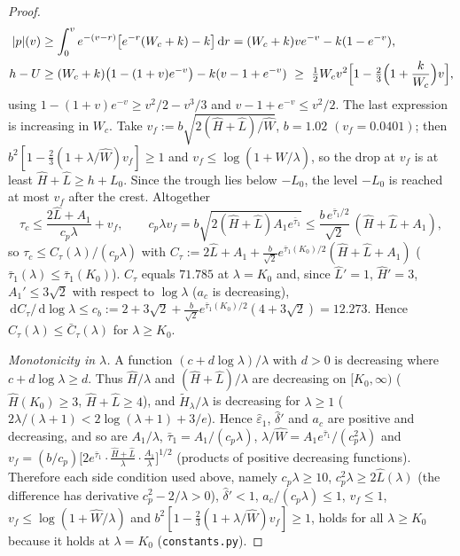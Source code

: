 \documentclass[11pt,a4paper]{article}
\theoremstyle{remark}\newtheorem{remark}[theorem]{Remark}
\newcommand{\dd}{\,\mathrm d}
\begin{document}
\begin{proof}
\begin{align*}
|p|(v)&\ge\int_0^ve^{-(v-r)}\bigl[e^{-r}(W_c+k)-k\bigr]\dd r=(W_c+k)ve^{-v}-k(1-e^{-v}),\\
h-U&\ge(W_c+k)\bigl(1-(1+v)e^{-v}\bigr)-k(v-1+e^{-v})\ \ge\ \tfrac12W_cv^2\Bigl[1-\tfrac23\Bigl(1+\frac k{W_c}\Bigr)v\Bigr],
\end{align*}
using $1-(1+v)e^{-v}\ge v^2/2-v^3/3$ and $v-1+e^{-v}\le v^2/2$. The last expression is increasing in
$W_c$. Take $v_f:=b\sqrt{2(\hat H+\hat L)/\hat W}$, $b=1.02$ $(v_f=0.0401)$; then
$b^2[1-\tfrac23(1+\lambda/\hat W)v_f]\ge1$ and $v_f\le\log(1+\hat W/\lambda)$, so the drop at $v_f$ is at
least $\hat H+\hat L\ge h+L_0$. Since the trough lies below $-L_0$, the level $-L_0$ is reached at most
$v_f$ after the crest. Altogether
\[
\tau_c\le\frac{2\hat L+A_1}{c_p\lambda}+v_f,\qquad
c_p\lambda v_f=b\sqrt{2(\hat H+\hat L)A_1e^{\bar\tau_1}}\le\frac{b\,e^{\bar\tau_1/2}}{\sqrt2}\,(\hat H+\hat L+A_1),
\]
so $\tau_c\le C_\tau(\lambda)/(c_p\lambda)$ with
$C_\tau:=2\hat L+A_1+\tfrac{b}{\sqrt2}e^{\bar\tau_1(K_0)/2}(\hat H+\hat L+A_1)$
($\bar\tau_1(\lambda)\le\bar\tau_1(K_0)$). $C_\tau$ equals $71.785$ at $\lambda=K_0$ and, since
$\hat L'=1$, $\hat H'=3$, $A_1'\le3\sqrt2$ with respect to $\log\lambda$ ($a_c$ is decreasing),
$\dd C_\tau/\dd\log\lambda\le c_b:=2+3\sqrt2+\tfrac{b}{\sqrt2}e^{\bar\tau_1(K_0)/2}(4+3\sqrt2)=12.273$.
Hence $C_\tau(\lambda)\le\bar C_\tau(\lambda)$ for $\lambda\ge K_0$.

\emph{Monotonicity in $\lambda$.} A function $(c+d\log\lambda)/\lambda$ with $d>0$ is decreasing where
$c+d\log\lambda\ge d$. Thus $\hat H/\lambda$ and $(\hat H+\hat L)/\lambda$ are decreasing on $[K_0,\infty)$
($\hat H(K_0)\ge3$, $\hat H+\hat L\ge4$), and $\tilde H_\lambda/\lambda$ is decreasing for $\lambda\ge1$
($2\lambda/(\lambda+1)<2\log(\lambda+1)+3/e$). Hence $\hat\varepsilon_1$, $\hat\delta'$ and $a_c$ are
positive and decreasing, and so are $A_1/\lambda$, $\bar\tau_1=A_1/(c_p\lambda)$,
$\lambda/\hat W=A_1e^{\bar\tau_1}/(c_p^2\lambda)$ and
$v_f=(b/c_p)\bigl[2e^{\bar\tau_1}\cdot\tfrac{\hat H+\hat L}{\lambda}\cdot\tfrac{A_1}{\lambda}\bigr]^{1/2}$
(products of positive decreasing functions). Therefore each side condition used above, namely
$c_p\lambda\ge10$, $c_p^2\lambda\ge2\hat L(\lambda)$ (the difference has derivative $c_p^2-2/\lambda>0$),
$\hat\delta'<1$, $a_c/(c_p\lambda)\le1$, $v_f\le1$, $v_f\le\log(1+\hat W/\lambda)$ and
$b^2[1-\tfrac23(1+\lambda/\hat W)v_f]\ge1$, holds for all $\lambda\ge K_0$ because it holds at
$\lambda=K_0$ (\texttt{constants.py}).
\end{proof}
\end{document}

